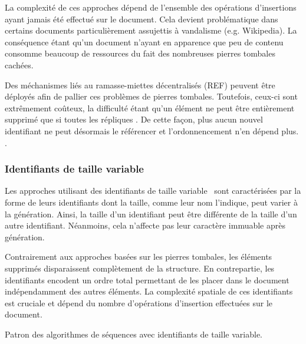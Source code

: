 La complexité de ces approches dépend de l'ensemble des opérations d'insertions
ayant jamais été effectué sur le document. Cela devient problématique dans
certains documents particulièrement assujettis à vandalisme (e.g. Wikipedia). La
conséquence étant qu'un document n'ayant en apparence que peu de contenu
consomme beaucoup de ressources du fait des nombreuses pierres tombales cachées.

Des méchanismes liés au ramasse-miettes décentralisés (REF) peuvent être
déployés afin de pallier ces problèmes de pierres tombales. Toutefois, ceux-ci
sont extrêmement coûteux, la difficulté étant qu'un élément ne peut être
entièrement supprimé que si toutes les répliques . De cette façon, plus aucun nouvel identifiant ne peut désormais le
référencer et l'ordonnencement n'en dépend plus. . 

\subsubsection{Identifiants de taille variable}

Les approches utilisant des identifiants de taille
variable~\cite{andre2013supporting, preguica2009commutative, weiss2009logoot}
sont caractérisées par la forme de leurs identifiants dont la taille, comme leur
nom l'indique, peut varier à la génération. Ainsi, la taille d'un identifiant
peut être différente de la taille d'un autre identifiant. Néanmoins, cela
n'affecte pas leur caractère immuable après génération.

Contrairement aux approches basées sur les pierres tombales, les éléments
supprimés disparaissent complètement de la structure. En contrepartie, les
identifiants encodent un ordre total permettant de les placer dans le document
indépendamment des autres éléments. La complexité spatiale de ces identifiants
est cruciale et dépend du nombre d'opérations d'insertion effectuées sur le
document.

\begin{algorithm}
  
  \caption{\label{algo:lseq:crdtabstract} Patron des algorithmes de séquences avec
    identifiants de taille variable.}
\end{algorithm}

